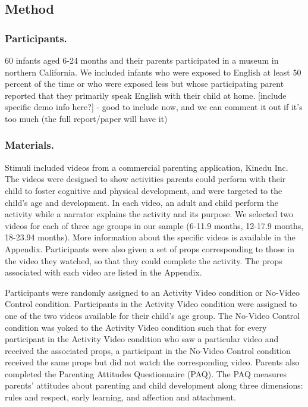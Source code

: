 \documentclass[10pt, letterpaper]{article}
\begin{document}
\subsection{Method}\label{method}

\subsubsection{Participants.}\label{participants.}

60 infants aged 6-24 months and their parents participated in a museum
in northern California. We included infants who were exposed to English
at least 50 percent of the time or who were exposed less but whose
participating parent reported that they primarily speak English with
their child at home. {[}include specific demo info here?{]} - good to
include now, and we can comment it out if it's too much (the full
report/paper will have it)

\subsubsection{Materials.}\label{materials.}

Stimuli included videos from a commercial parenting application, Kinedu
Inc. The videos were designed to show activities parents could perform
with their child to foster cognitive and physical development, and were
targeted to the child's age and development. In each video, an adult and
child perform the activity while a narrator explains the activity and
its purpose. We selected two videos for each of three age groups in our
sample (6-11.9 months, 12-17.9 months, 18-23.94 months). More
information about the specific videos is available in the Appendix.
Participants were also given a set of props corresponding to those in
the video they watched, so that they could complete the activity. The
props associated with each video are listed in the Appendix.

Participants were randomly assigned to an Activity Video condition or
No-Video Control condition. Participants in the Activity Video condition
were assigned to one of the two videos available for their child's age
group. The No-Video Control condition was yoked to the Activity Video
condition such that for every participant in the Activity Video
condition who saw a particular video and received the associated props,
a participant in the No-Video Control condition received the same props
but did not watch the corresponding video. Parents also completed the
Parenting Attitudes Questionnaire (PAQ). The PAQ measures parents'
attitudes about parenting and child development along three dimensions:
rules and respect, early learning, and affection and attachment.
\end{document}
